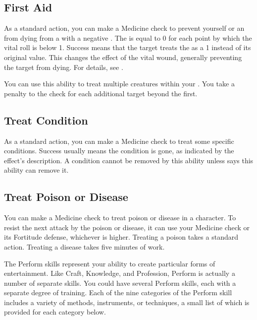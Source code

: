     \subsection{First Aid}\label{First Aid}
        As a standard action, you can make a Medicine check to prevent yourself or an  from dying from a  with a negative .
        The  is equal to 0  for each point by which the vital roll is below 1.
        Success means that the target treats the  as a 1 instead of its original value.
        This changes the effect of the vital wound, generally preventing the target from dying.
        For details, see .

        You can use this ability to treat multiple creatures within your .
        You take a  penalty to the check for each additional target beyond the first.

    \subsection{Treat Condition}\label{Treat Condition}
        As a standard action, you can make a Medicine check to treat some specific conditions.
        Success usually means the condition is gone, as indicated by the effect's description.
        A condition cannot be removed by this ability unless says this ability can remove it.

    \subsection{Treat Poison or Disease}
        You can make a Medicine check to treat poison or disease in a character.
        To resist the next attack by the poison or disease, it can use your Medicine check or its Fortitude defense, whichever is higher.
        Treating a poison takes a standard action. Treating a disease takes five minutes of work.

\newpage
{}
    The Perform skills represent your ability to create particular forms of entertainment.
        Like Craft, Knowledge, and Profession, Perform is actually a number of separate skills.
        You could have several Perform skills, each with a separate degree of training.
        Each of the nine categories of the Perform skill includes a variety of methods, instruments, or techniques, a small list of which is provided for each category below.

